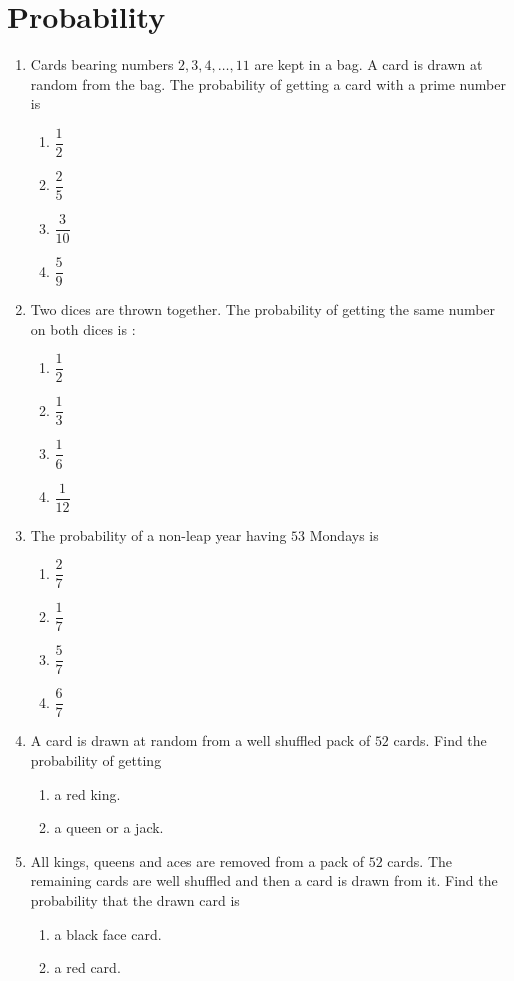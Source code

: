 \documentclass[journal,12pt,onecolumn]{IEEEtran}
\theoremstyle{remark}
\begin{document}
\section{Probability}
\begin{enumerate}
\item Cards bearing numbers $2, 3, 4, \ldots, 11$ are kept in a bag. A card is drawn at random from the bag. The probability of getting a card with a prime number is 
\begin{enumerate}
\item $\dfrac{1}{2}$ 
\item $\dfrac{2}{5}$ 
\item $\dfrac{3}{10}$ 
\item $\dfrac{5}{9}$ 
\end{enumerate}
\item Two dices are thrown together. The probability of getting the same number on both dices is : 
\begin{enumerate}
\item $\dfrac{1}{2}$ 
\item $\dfrac{1}{3}$ 
\item $\dfrac{1}{6}$ 
\item $\dfrac{1}{12}$ 
\end{enumerate}
\item The probability of a non-leap year having $53$ Mondays is  
\begin{enumerate}
\item $\dfrac{2}{7}$ 
\item $\dfrac{1}{7}$ 
\item $\dfrac{5}{7}$ 
\item $\dfrac{6}{7}$ 
\end{enumerate}
\item A card is drawn at random from a well shuffled pack of $52$ cards. Find the probability of getting 
\begin{enumerate}[label=\Roman*.]
\item a red king. 
\item a queen or a jack. 
\end{enumerate}
\item All kings, queens and aces are removed from a pack of $52$ cards. The remaining cards are well shuffled and then a card is drawn from it. Find the probability that the drawn card is  
\begin{enumerate}[label=\Roman*.]
\item a black face card. 
\item a red card. 
\end{enumerate}


\end{enumerate}
\end{document}
